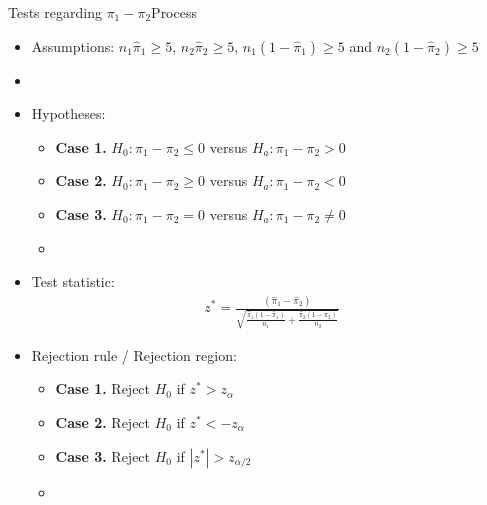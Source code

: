 \documentclass[xcolor=dvipsnames]{beamer}
\begin{document}
\begin{frame}{Tests regarding $\pi_1 - \pi_2$}{Process}
	\begin{itemize}
 \item Assumptions: $n_1 \hat{\pi}_1 \geq 5$, $n_2 \hat{\pi}_2 \geq 5$, $n_1 (1-\hat{\pi}_1) \geq 5$ and $n_2 (1-\hat{\pi}_2) \geq 5$  \pause
		\item[]
		\item Hypotheses:  \pause
		\begin{itemize}
			\item \textbf{Case 1.} $H_0: \pi_1-\pi_2 \leq 0$ versus $H_a: \pi_1-\pi_2 > 0$  \pause
			\item \textbf{Case 2.} $H_0: \pi_1-\pi_2 \geq 0$ versus $H_a: \pi_1-\pi_2 < 0$ \pause
			\item \textbf{Case 3.} $H_0: \pi_1-\pi_2 = 0$ versus $H_a: \pi_1-\pi_2 \neq 0$ \pause
			\item[]
		\end{itemize}
		
		\item Test statistic:  \pause
		\begin{gather*}
		z^*=\frac{(\hat{\pi}_1 - \hat{\pi}_2)}{\sqrt{\frac{\hat{\pi}_1 (1-\hat{\pi}_1)}{n_1}+\frac{\hat{\pi}_2 (1-\hat{\pi}_2)}{n_2}}}
		\end{gather*}  \pause
		\item Rejection rule / Rejection region:  \pause
		\begin{itemize}
			\item \textbf{Case 1.} Reject $H_0$ if $z^* > z_{\alpha}$  \pause
			\item \textbf{Case 2.} Reject $H_0$ if $z^* < -z_{\alpha}$  \pause
			\item \textbf{Case 3.} Reject $H_0$ if $|z^*| > z_{\alpha / 2}$
			\item[]
		\end{itemize}
	\end{itemize}
\end{frame}
\end{document}
